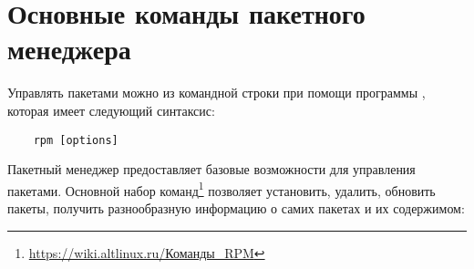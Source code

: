 \chapter{Основные команды пакетного менеджера}\label{basic-package-manager-commands}
Управлять пакетами можно из командной строки при помощи программы , которая имеет следующий синтаксис:
\begin{verbatim}
	rpm [options]
\end{verbatim}

Пакетный менеджер  предоставляет базовые возможности для управления пакетами. Основной набор команд\footnote{\href{https://wiki.altlinux.ru/Команды_RPM}{https://wiki.altlinux.ru/Команды\_RPM}} позволяет установить, удалить, обновить пакеты, получить разнообразную информацию о самих пакетах и их содержимом:

